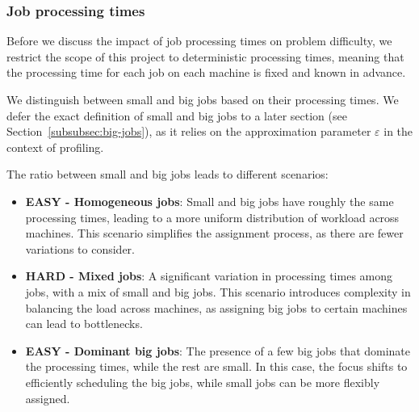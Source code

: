 \subsubsection{Job processing times}
\label{sec:job_processing_times}
Before we discuss the impact of job processing times on problem difficulty, we restrict the scope of this project to deterministic processing times, meaning that the processing time for each job on each machine is fixed and known in advance.

We distinguish between small and big jobs based on their processing times.
We defer the exact definition of small and big jobs to a later section (see Section~\ref{subsubsec:big-jobs}), as it relies on the approximation parameter $\varepsilon$ in the context of profiling.

The ratio between small and big jobs leads to different scenarios:
\begin{itemize}
  \item \textbf{EASY - Homogeneous jobs}: Small and big jobs have roughly the same processing times, leading to a more uniform distribution of workload across machines.
  This scenario simplifies the assignment process, as there are fewer variations to consider.
  \item \textbf{HARD - Mixed jobs}: A significant variation in processing times among jobs, with a mix of small and big jobs.
  This scenario introduces complexity in balancing the load across machines, as assigning big jobs to certain machines can lead to bottlenecks.
  \item \textbf{EASY - Dominant big jobs}: The presence of a few big jobs that dominate the processing times, while the rest are small.
  In this case, the focus shifts to efficiently scheduling the big jobs, while small jobs can be more flexibly assigned.
\end{itemize}


